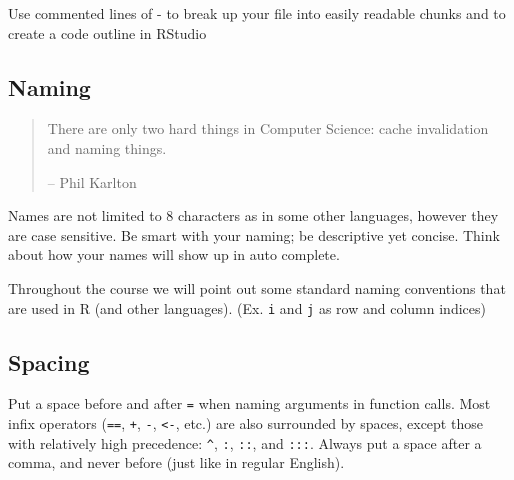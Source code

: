 \documentclass[]{book}
\newenvironment{Shaded}{\begin{snugshade}}{\end{snugshade}}
\newcommand{\CommentTok}[1]{\textcolor[rgb]{0.56,0.35,0.01}{\textit{#1}}}
\newcommand{\DecValTok}[1]{\textcolor[rgb]{0.00,0.00,0.81}{#1}}
\newcommand{\KeywordTok}[1]{\textcolor[rgb]{0.13,0.29,0.53}{\textbf{#1}}}
\newcommand{\NormalTok}[1]{#1}
\newcommand{\OperatorTok}[1]{\textcolor[rgb]{0.81,0.36,0.00}{\textbf{#1}}}
\newcommand{\StringTok}[1]{\textcolor[rgb]{0.31,0.60,0.02}{#1}}
\theoremstyle{definition}
\theoremstyle{definition}
\theoremstyle{definition}
\theoremstyle{remark}
\let\BeginKnitrBlock\begin \let\EndKnitrBlock\end
\begin{document}
\BeginKnitrBlock{rmdtip}
Use commented lines of - to break up your file into easily readable
chunks and to create a code outline in RStudio
\EndKnitrBlock{rmdtip}

\hypertarget{naming}{%
\subsection{Naming}\label{naming}}

\begin{quote}
There are only two hard things in Computer Science: cache invalidation
and naming things.

-- Phil Karlton
\end{quote}

Names are not limited to 8 characters as in some other languages,
however they are case sensitive. Be smart with your naming; be
descriptive yet concise. Think about how your names will show up in auto
complete.

Throughout the course we will point out some standard naming conventions
that are used in R (and other languages). (Ex. \texttt{i} and \texttt{j}
as row and column indices)

\begin{Shaded}
\end{Shaded}

\hypertarget{spacing}{%
\subsection{Spacing}\label{spacing}}

Put a space before and after \texttt{=} when naming arguments in
function calls. Most infix operators (\texttt{==}, \texttt{+},
\texttt{-}, \texttt{\textless{}-}, etc.) are also surrounded by spaces,
except those with relatively high precedence: \texttt{\^{}}, \texttt{:},
\texttt{::}, and \texttt{:::}. Always put a space after a comma, and
never before (just like in regular English).
\end{document}
